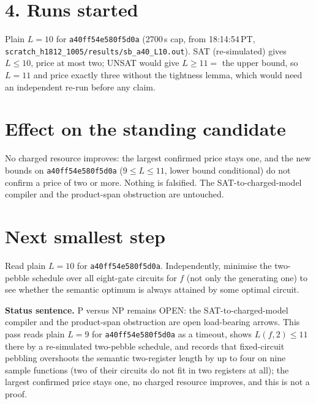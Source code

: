 \documentclass[11pt]{article}
\begin{document}
\section*{4. Runs started}
Plain $L=10$ for \texttt{a40ff54e580f5d0a} (2700\,s cap, from 18:14:54\,PT, \texttt{scratch\_h1812\_1005/results/sb\_a40\_L10.out}). SAT (re-simulated) gives $L\le 10$, price at most two; UNSAT would give $L\ge 11=$ the upper bound, so $L=11$ and price exactly three without the tightness lemma, which would need an independent re-run before any claim.

\section*{Effect on the standing candidate}
No charged resource improves: the largest confirmed price stays one, and the new bounds on \texttt{a40ff54e580f5d0a} ($9\le L\le 11$, lower bound conditional) do not confirm a price of two or more. Nothing is falsified. The SAT-to-charged-model compiler and the product-span obstruction are untouched.

\section*{Next smallest step}
Read plain $L=10$ for \texttt{a40ff54e580f5d0a}. Independently, minimise the two-pebble schedule over all eight-gate circuits for $f$ (not only the generating one) to see whether the semantic optimum is always attained by some optimal circuit.

\bigskip
\noindent\textbf{Status sentence.} P versus NP remains OPEN: the SAT-to-charged-model compiler and the product-span obstruction are open load-bearing arrows. This pass reads plain $L=9$ for \texttt{a40ff54e580f5d0a} as a timeout, shows $L(f,2)\le 11$ there by a re-simulated two-pebble schedule, and records that fixed-circuit pebbling overshoots the semantic two-register length by up to four on nine sample functions (two of their circuits do not fit in two registers at all); the largest confirmed price stays one, no charged resource improves, and this is not a proof.
\end{document}
